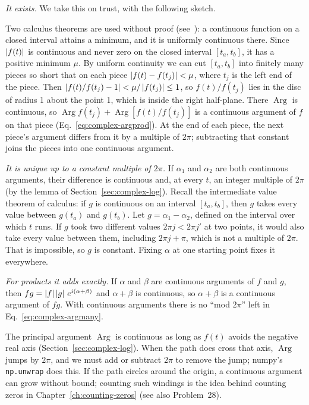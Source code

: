 \emph{It exists.} We take this on trust, with the following sketch.
\begin{beyond}
Two calculus theorems are used without proof (see~\cite{rhb}): a continuous function on a closed interval attains a minimum, and it is uniformly continuous there. Since $\left\lvert f(t)\right\rvert$ is continuous and never zero on the closed interval $[t_a,t_b]$, it has a positive minimum $\mu$. By uniform continuity we can cut $[t_a,t_b]$ into finitely many pieces so short that on each piece $\left\lvert f(t)-f(t_j)\right\rvert<\mu$, where $t_j$ is the left end of the piece. Then $\left\lvert f(t)/f(t_j)-1\right\rvert<\mu/\left\lvert f(t_j)\right\rvert\le1$, so $f(t)/f(t_j)$ lies in the disc of radius 1 about the point 1, which is inside the right half-plane. There $\operatorname{Arg}$ is continuous, so $\operatorname{Arg}f(t_j)+\operatorname{Arg}[f(t)/f(t_j)]$ is a continuous argument of $f$ on that piece (Eq.~\eqref{eq:complex-argprod}). At the end of each piece, the next piece's argument differs from it by a multiple of $2\pi$; subtracting that constant joins the pieces into one continuous argument.
\end{beyond}

\emph{It is unique up to a constant multiple of $2\pi$.} If $\alpha_1$ and $\alpha_2$ are both continuous arguments, their difference is continuous and, at every $t$, an integer multiple of $2\pi$ (by the lemma of Section~\ref{sec:complex-log}). Recall the intermediate value theorem of calculus: if $g$ is continuous on an interval $[t_a,t_b]$, then $g$ takes every value between $g(t_a)$ and $g(t_b)$. Let $g=\alpha_1-\alpha_2$, defined on the interval over which $t$ runs. If $g$ took two different values $2\pi j<2\pi j'$ at two points, it would also take every value between them, including $2\pi j+\pi$, which is not a multiple of $2\pi$. That is impossible, so $g$ is constant. Fixing $\alpha$ at one starting point fixes it everywhere.

\emph{For products it adds exactly.} If $\alpha$ and $\beta$ are continuous arguments of $f$ and $g$, then $fg=\left\lvert f\right\rvert\left\lvert g\right\rvert\,e^{i(\alpha+\beta)}$ and $\alpha+\beta$ is continuous, so $\alpha+\beta$ is a continuous argument of $fg$. With continuous arguments there is no ``mod $2\pi$'' left in Eq.~\eqref{eq:complex-argmany}.

The principal argument $\operatorname{Arg}$ is continuous as long as $f(t)$ avoids the negative real axis (Section~\ref{sec:complex-log}). When the path does cross that axis, $\operatorname{Arg}$ jumps by $2\pi$, and we must add or subtract $2\pi$ to remove the jump; numpy's \texttt{np.unwrap} does this. If the path circles around the origin, a continuous argument can grow without bound; counting such windings is the idea behind counting zeros in Chapter~\ref{ch:counting-zeros} (see also Problem~28).

